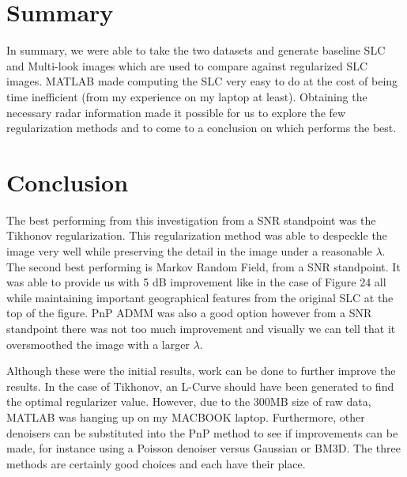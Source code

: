 \documentclass[conference]{IEEEtran}
\begin{document}
\section{Summary}
\par In summary, we were able to take the two datasets and generate baseline SLC and Multi-look images which are used to compare against regularized SLC images. MATLAB made computing the SLC very easy to do at the cost of being time inefficient (from my experience on my laptop at least). Obtaining the necessary radar information made it possible for us to explore the few regularization methods and to come to a conclusion on which performs the best.
\section{Conclusion}
\par The best performing from this investigation from a SNR standpoint was the Tikhonov regularization. This regularization method was able to despeckle the image very well while preserving the detail in the image under a reasonable $\lambda$. The second best performing is Markov Random Field, from a SNR standpoint. It was able to provide us with 5 dB improvement like in the case of Figure 24 all while maintaining important geographical features from the original SLC at the top of the figure. PnP ADMM was also a good option however from a SNR standpoint there was not too much improvement and visually we can tell that it oversmoothed the image with a larger $\lambda$. 
\par Although these were the initial results, work can be done to further improve the results. In the case of Tikhonov, an L-Curve should have been generated to find the optimal regularizer value. However, due to the 300MB size of raw data, MATLAB was hanging up on my MACBOOK laptop. Furthermore, other denoisers can be substituted into the PnP method to see if improvements can be made, for instance using a Poisson denoiser versus Gaussian or BM3D. The three methods are certainly good choices and each have their place. 
\end{document}
